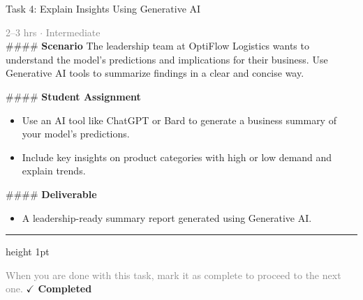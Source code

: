 \documentclass[10pt,a4paper]{article}
\begin{document}
\begin{taskbox}{Task 4: Explain Insights Using Generative AI}

    {\small \textcolor{gray}{2--3 hrs $\cdot$ Intermediate}}\\[12pt]

    \#\#\#\# \textbf{Scenario}  
The leadership team at OptiFlow Logistics wants to understand the model’s predictions and implications for their business. Use Generative AI tools to summarize findings in a clear and concise way.

\#\#\#\# \textbf{Student Assignment}  
\begin{itemize}
    \item Use an AI tool like ChatGPT or Bard to generate a business summary of your model’s predictions.  
    \item Include key insights on product categories with high or low demand and explain trends.  
\end{itemize}

\#\#\#\# \textbf{Deliverable}  
\begin{itemize}
    \item A leadership-ready summary report generated using Generative AI.\par
\end{itemize}

    \vspace{16pt}

    \textcolor{cardBorder}{\hrule height 1pt}\vspace{8pt}

    \small \textcolor{gray}{When you are done with this task, mark it as complete to proceed to the next one.} \hfill \textbf{\textcolor{brandDark}{$\checkmark$ Completed}}

\end{taskbox}
\end{document}
